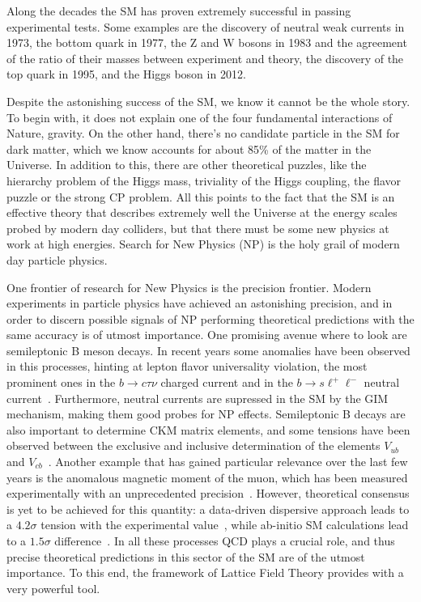 Along the decades the SM has proven extremely successful in passing experimental tests. Some examples are the discovery of neutral weak currents in 1973, the bottom quark in 1977, the Z and W bosons in 1983 and the agreement of the ratio of their masses between experiment and theory, the discovery of the top quark in 1995, and the Higgs boson in 2012. 

Despite the astonishing success of the SM, we know it cannot be the whole story. To begin with, it does not explain one of the four fundamental interactions of Nature, gravity. On the other hand, there's no candidate particle in the SM for dark matter, which we know accounts for about 85\% of the matter in the Universe. In addition to this, there are other theoretical puzzles, like the hierarchy problem of the Higgs mass, triviality of the Higgs coupling, the flavor puzzle or the strong CP problem. All this points to the fact that the SM is an effective theory that describes extremely well the Universe at the energy scales probed by modern day colliders, but that there must be some new physics at work at high energies. Search for New Physics (NP) is the holy grail of modern day particle physics. 

One frontier of research for New Physics is the precision frontier. Modern experiments in particle physics have achieved an astonishing precision, and in order to discern possible signals of NP performing theoretical predictions with the same accuracy is of utmost importance. One promising avenue where to look are semileptonic B meson decays. In recent years some anomalies have been observed in this processes, hinting at lepton flavor universality violation, the most prominent ones in the $b\to c\tau\nu$ charged current and in the $b\to s\ell^+\ell^-$ neutral current~\citep{Capdevila:2023yhq}. Furthermore, neutral currents are supressed in the SM by the GIM mechanism, making them good probes for NP effects. Semileptonic B decays are also important to determine CKM matrix elements, and some tensions have been observed between the exclusive and inclusive determination of the elements $V_{ub}$ and $V_{cb}$~\citep{Ricciardi:2019zph}. Another example that has gained particular relevance over the last few years is the anomalous magnetic moment of the muon, which has been measured experimentally with an unprecedented precision~\citep{Muong-2:2006rrc}. However, theoretical consensus is yet to be achieved for this quantity: a data-driven dispersive approach leads to a $4.2\sigma$ tension with the experimental value~\citep{Aoyama:2020ynm}, while ab-initio SM calculations lead to a $1.5\sigma$ difference~\citep{Borsanyi:2020mff}. In all these processes QCD plays a crucial role, and thus precise theoretical predictions in this sector of the SM are of the utmost importance. To this end, the framework of Lattice Field Theory provides with a very powerful tool.

